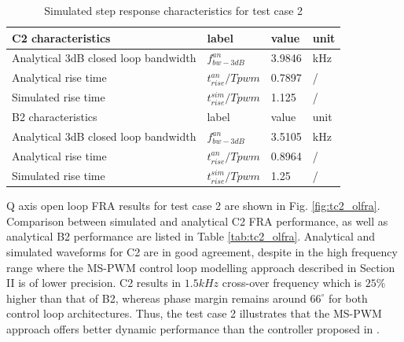 \documentclass[journal]{IEEEtran}
\begin{document}
\begin{table}[h!]
			  \caption{Simulated step response characteristics for test case 2}
              \label{tab:C2_step}
              \centering
              \begin{tabular}{llll}
                           \midrule\midrule
        C2 characteristics & label & value   & unit\\
        \midrule               
                  Analytical 3dB closed loop bandwidth	& $f_{bw-3dB}^{an}$ & 3.9846
  &kHz\\  
                  Analytical rise time  & $t_{rise}^{an}/T{pwm}$ & 0.7897 & /   \\
                  Simulated rise time  & $t_{rise}^{sim}/T{pwm}$ & 1.125 & /   \\
                  \midrule\midrule
        B2 characteristics & label & value    & unit\\
                  \midrule
                  Analytical 3dB closed loop bandwidth	& $f_{bw-3dB}^{an}$ & 3.5105 &kHz\\  
                  Analytical rise time  & $t_{rise}^{an}/T{pwm}$ & 0.8964  & /   \\
                  Simulated rise time  & $t_{rise}^{sim}/T{pwm}$ & 1.25 & /   \\
                  \midrule\midrule
                                                        
              \end{tabular}
\end{table}

Q axis open loop FRA results for test case 2 are shown in Fig. \ref{fig:tc2_olfra}.  Comparison between simulated and analytical C2 FRA performance, as well as analytical B2 performance are listed in Table \ref{tab:tc2_olfra}. Analytical and simulated waveforms for C2 are in good agreement, despite in the high frequency range  where the MS-PWM control loop modelling approach described in Section II is of lower precision. C2 results in $1.5kHz$ cross-over frequency which is $25\%$ higher than that of B2, whereas phase margin remains around $66^\circ$ for both control loop architectures. Thus, the test case 2 illustrates that the MS-PWM approach offers better dynamic performance than the controller proposed in  \cite{vuksa2017}.\par
\end{document}
